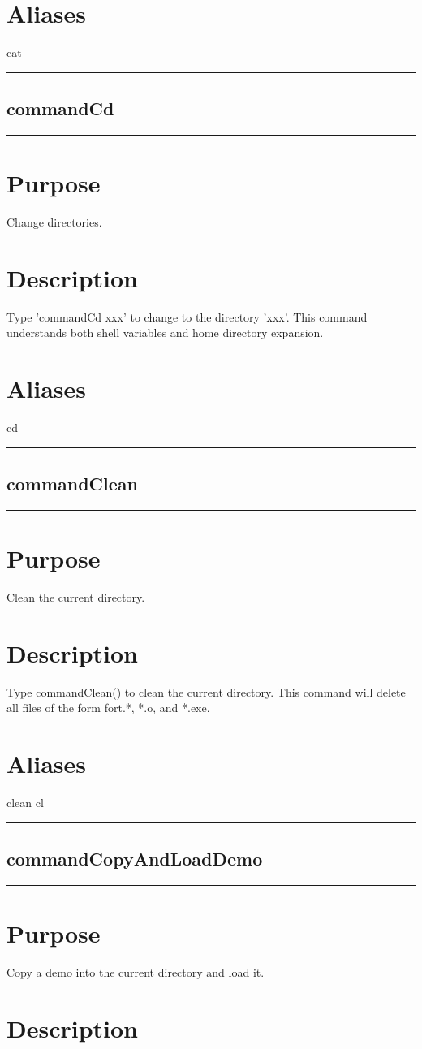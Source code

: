 \documentclass[12pt]{report}
\begin{document}
\begin{minipage}{6in}
    \section*{Aliases}
cat \medskip\hrule\end{minipage}\subsection{commandCd} \label{sec:clui_ref_commandCd}\begin{minipage}{6in}\hrule\medskip\section*{Purpose}
Change directories.\section*{Description}
    
    Type 'commandCd xxx' to change to the directory 'xxx'.  This command
    understands both shell variables and home directory expansion.
    \section*{Aliases}
cd \medskip\hrule\end{minipage}\subsection{commandClean} \label{sec:clui_ref_commandClean}\begin{minipage}{6in}\hrule\medskip\section*{Purpose}
Clean the current directory.\section*{Description}

    Type commandClean() to clean the current directory.  This command will
    delete all files of the form fort.*, *.o, and *.exe.
    \section*{Aliases}
clean cl \medskip\hrule\end{minipage}\subsection{commandCopyAndLoadDemo} \label{sec:clui_ref_commandCopyAndLoadDemo}\begin{minipage}{6in}\hrule\medskip\section*{Purpose}
Copy a demo into the current directory and load it.\section*{Description}


\end{minipage}
\end{document}
